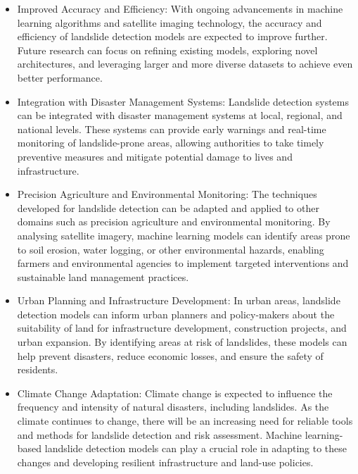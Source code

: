 \documentclass[12pt,a4paper]{report}
\begin{document}
		\begin{itemize}
		
    \item Improved Accuracy and Efficiency: With ongoing advancements in machine learning algorithms and satellite imaging technology, the accuracy and efficiency of landslide detection models are expected to improve further. Future research can focus on refining existing models, exploring novel architectures, and leveraging larger and more diverse datasets to achieve even better performance.

    
    \item Integration with Disaster Management Systems: Landslide detection systems can be integrated with disaster management systems at local, regional, and national levels. These systems can provide early warnings and real-time monitoring of landslide-prone areas, allowing authorities to take timely preventive measures and mitigate potential damage to lives and infrastructure.
 
    
    \item Precision Agriculture and Environmental Monitoring: The techniques developed for landslide detection can be adapted and applied to other domains such as precision agriculture and environmental monitoring. By analysing satellite imagery, machine learning models can identify areas prone to soil erosion, water logging, or other environmental hazards, enabling farmers and environmental agencies to implement targeted interventions and sustainable land management practices.
 
    \item Urban Planning and Infrastructure Development: In urban areas, landslide detection models can inform urban planners and policy-makers about the suitability of land for infrastructure development, construction projects, and urban expansion. By identifying areas at risk of landslides, these models can help prevent disasters, reduce economic losses, and ensure the safety of residents.
 
    \item Climate Change Adaptation: Climate change is expected to influence the frequency and intensity of natural disasters, including landslides. As the climate continues to change, there will be an increasing need for reliable tools and methods for landslide detection and risk assessment. Machine learning-based landslide detection models can play a crucial role in adapting to these changes and developing resilient infrastructure and land-use policies.


\end{itemize}
\end{document}
